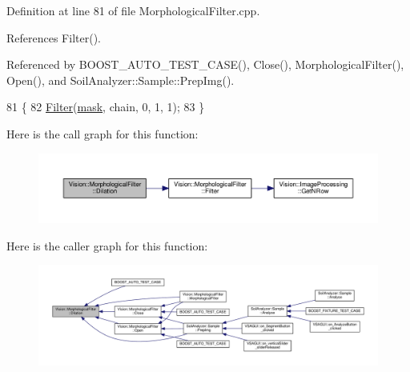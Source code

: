 Definition at line 81 of file Morphological\+Filter.\+cpp.



References Filter().



Referenced by B\+O\+O\+S\+T\+\_\+\+A\+U\+T\+O\+\_\+\+T\+E\+S\+T\+\_\+\+C\+A\+S\+E(), Close(), Morphological\+Filter(), Open(), and Soil\+Analyzer\+::\+Sample\+::\+Prep\+Img().


\begin{DoxyCode}
81                                                               \{
82   \hyperlink{class_vision_1_1_morphological_filter_ab743062372a8d0b26dabfd27451e72ed}{Filter}(\hyperlink{_gen_blob_8m_a5d76cc2129e79ba1941d2cc2f53b9e8e}{mask}, chain, 0, 1, 1);
83 \}
\end{DoxyCode}


Here is the call graph for this function\+:\nopagebreak
\begin{figure}[H]
\begin{center}
\leavevmode
\includegraphics[width=350pt]{class_vision_1_1_morphological_filter_abfba03324b8dd0280925463941345417_cgraph}
\end{center}
\end{figure}




Here is the caller graph for this function\+:\nopagebreak
\begin{figure}[H]
\begin{center}
\leavevmode
\includegraphics[width=350pt]{class_vision_1_1_morphological_filter_abfba03324b8dd0280925463941345417_icgraph}
\end{center}
\end{figure}


\hypertarget{class_vision_1_1_morphological_filter_a62ad82519dc19be6367193a5d539c98b}{}
